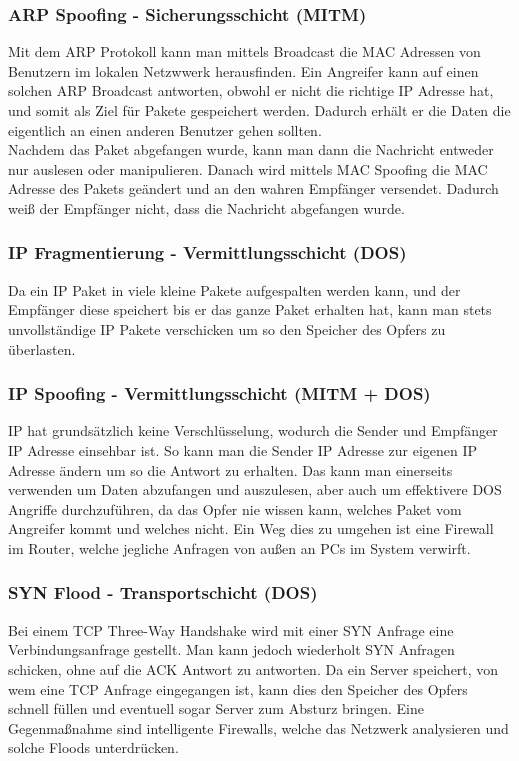 \documentclass{article}
\begin{document}
	  \subsubsection{ARP Spoofing - Sicherungsschicht (MITM)}
	  Mit dem ARP Protokoll kann man mittels Broadcast die MAC Adressen von Benutzern im lokalen Netzwwerk herausfinden. Ein Angreifer kann auf einen solchen ARP Broadcast antworten, obwohl er nicht die richtige IP Adresse hat, und somit als Ziel für Pakete gespeichert werden. Dadurch erhält er die Daten die eigentlich an einen anderen Benutzer gehen sollten. \\
	  Nachdem das Paket abgefangen wurde, kann man dann die Nachricht entweder nur auslesen oder manipulieren. Danach wird mittels MAC Spoofing die MAC Adresse des Pakets geändert und an den wahren Empfänger versendet. Dadurch weiß der Empfänger nicht, dass die Nachricht abgefangen wurde.
	  \subsubsection{IP Fragmentierung - Vermittlungsschicht (DOS)}
	  Da ein IP Paket in viele kleine Pakete aufgespalten werden kann, und der Empfänger diese speichert bis er das ganze Paket erhalten hat, kann man stets unvollständige IP Pakete verschicken um so den Speicher des Opfers zu überlasten.
	  \subsubsection{IP Spoofing - Vermittlungsschicht (MITM + DOS)}
	  IP hat grundsätzlich keine Verschlüsselung, wodurch die Sender und Empfänger IP Adresse einsehbar ist. So kann man die Sender IP Adresse zur eigenen IP Adresse ändern um so die Antwort zu erhalten. Das kann man einerseits verwenden um Daten abzufangen und auszulesen, aber auch um effektivere DOS Angriffe durchzuführen, da das Opfer nie wissen kann, welches Paket vom Angreifer kommt und welches nicht. Ein Weg dies zu umgehen ist eine Firewall im Router, welche jegliche Anfragen von außen an PCs im System verwirft.
	  \subsubsection{SYN Flood - Transportschicht (DOS)}
	  Bei einem TCP Three-Way Handshake wird mit einer SYN Anfrage eine Verbindungsanfrage gestellt. Man kann jedoch wiederholt SYN Anfragen schicken, ohne auf die ACK Antwort zu antworten. Da ein Server speichert, von wem eine TCP Anfrage eingegangen ist, kann dies den Speicher des Opfers schnell füllen und eventuell sogar Server zum Absturz bringen. Eine Gegenmaßnahme sind intelligente Firewalls, welche das Netzwerk analysieren und solche Floods unterdrücken.
\end{document}
